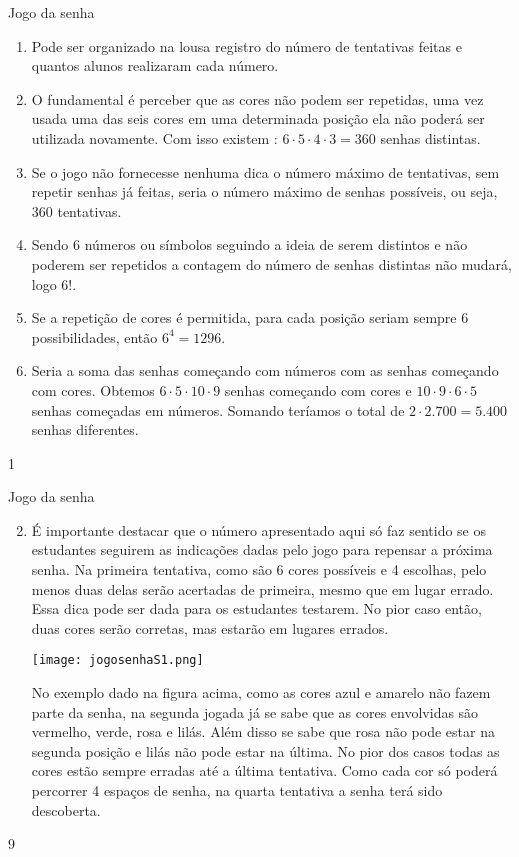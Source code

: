 \begin{answer}{Jogo da senha}
{
\begin{enumerate}
\item Pode ser organizado na lousa registro do número de tentativas feitas e quantos alunos realizaram cada número. 

\setcounter{enumi}{2}
\item O fundamental é perceber que as cores não podem ser repetidas, uma vez usada uma das seis cores em uma determinada posição ela não poderá ser utilizada novamente. Com isso existem : $6 \cdot 5 \cdot 4 \cdot 3 = 360$ senhas distintas. 
\item Se o jogo não fornecesse nenhuma dica o número máximo de tentativas, sem repetir senhas já feitas, seria o número máximo de senhas possíveis, ou seja, $360$ tentativas.

\item Sendo 6 números ou símbolos seguindo a ideia de serem distintos e não poderem ser repetidos a contagem do número de senhas distintas não mudará, logo $6!$. 

\item Se a repetição de cores é permitida, para cada posição seriam sempre 6 possibilidades, então $6^4=1296.$

\item Seria a soma das senhas começando com números com as senhas começando com cores. Obtemos  $6 \cdot 5 \cdot  10 \cdot 9 $ senhas começando com cores e $10 \cdot 9 \cdot 6 \cdot 5$ senhas começadas em números. Somando teríamos o total de $2 \cdot 2.700= 5.400$ senhas diferentes.
\end{enumerate}
}{1}
\end{answer}
\begin{answer}{Jogo da senha}
{
\begin{enumerate}\setcounter{enumi}{1}
\item É importante destacar que o número apresentado aqui só faz sentido se os estudantes seguirem as indicações dadas pelo jogo para repensar a próxima senha. 
Na primeira tentativa, como são 6 cores possíveis e 4 escolhas, pelo menos duas delas serão acertadas de primeira, mesmo que em lugar errado. Essa dica pode ser dada para os estudantes testarem. No pior caso então, duas cores serão corretas, mas estarão em lugares errados.

\begin{center}
\texttt{[image: jogosenhaS1.png]}
\end{center}
No exemplo dado na figura acima, como as cores azul e amarelo não fazem parte da senha, na segunda jogada já se sabe que as cores envolvidas são vermelho, verde, rosa e lilás. Além disso se sabe que rosa não pode estar na segunda posição e lilás não pode estar na última. No pior dos casos todas as cores estão sempre erradas até a última tentativa. Como cada cor só poderá percorrer 4 espaços de senha, na quarta tentativa a senha terá sido descoberta. 
\end{enumerate}
}{9}
\end{answer}
